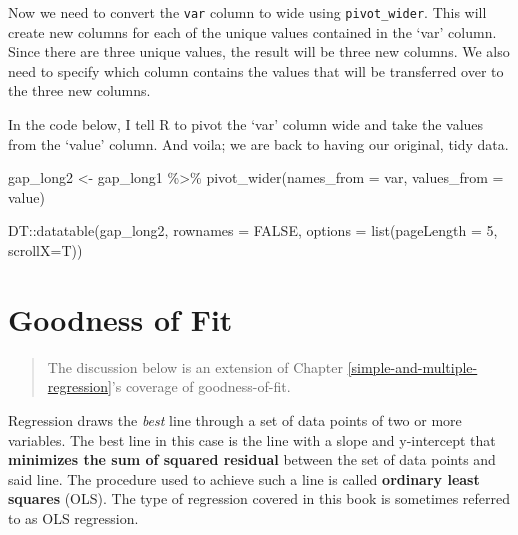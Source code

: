 \documentclass[
]{book}
\makeatletter
\newenvironment{Shaded}{\begin{snugshade}}{\end{snugshade}}
\newcommand{\AttributeTok}[1]{\textcolor[rgb]{0.61,0.61,0.61}{#1}}
\newcommand{\ConstantTok}[1]{\textcolor[rgb]{0,0,0}{#1}}
\newcommand{\DecValTok}[1]{\textcolor[rgb]{0.06,0.06,0.06}{#1}}
\newcommand{\FunctionTok}[1]{\textcolor[rgb]{0,0,0}{#1}}
\newcommand{\NormalTok}[1]{#1}
\newcommand{\OtherTok}[1]{\textcolor[rgb]{0.37,0.37,0.37}{#1}}
\newcommand{\SpecialCharTok}[1]{\textcolor[rgb]{0,0,0}{#1}}
\newenvironment{kframe}{%
\medskip{}
\setlength{\fboxsep}{.8em}
 \def\at@end@of@kframe{}%
 \ifinner\ifhmode%
  \def\at@end@of@kframe{\end{minipage}}%
  \begin{minipage}{\columnwidth}%
 \fi\fi%
 \def\FrameCommand##1{\hskip\@totalleftmargin \hskip-\fboxsep
 \colorbox{shadecolor}{##1}\hskip-\fboxsep
     \hskip-\linewidth \hskip-\@totalleftmargin \hskip\columnwidth}%
 \MakeFramed {\advance\hsize-\width
   \@totalleftmargin\z@ \linewidth\hsize
   \@setminipage}}%
 {\par\unskip\endMakeFramed%
 \at@end@of@kframe}
\renewenvironment{Shaded}{\begin{kframe}}{\end{kframe}}
\makeatother
\begin{document}
\hypertarget{htmlwidget-335f70a3897292f03ade}{}

Now we need to convert the \texttt{var} column to wide using \texttt{pivot\_wider}. This will create new columns for each of the unique values contained in the `var' column. Since there are three unique values, the result will be three new columns. We also need to specify which column contains the values that will be transferred over to the three new columns.

In the code below, I tell R to pivot the `var' column wide and take the values from the `value' column. And voila; we are back to having our original, tidy data.

\begin{Shaded}
\begin{Highlighting}[]
\NormalTok{gap\_long2 }\OtherTok{\textless{}{-}}\NormalTok{ gap\_long1 }\SpecialCharTok{\%\textgreater{}\%} 
  \FunctionTok{pivot\_wider}\NormalTok{(}\AttributeTok{names\_from =}\NormalTok{ var,}
              \AttributeTok{values\_from =}\NormalTok{ value)}

\NormalTok{DT}\SpecialCharTok{::}\FunctionTok{datatable}\NormalTok{(gap\_long2, }\AttributeTok{rownames =} \ConstantTok{FALSE}\NormalTok{, }\AttributeTok{options =} \FunctionTok{list}\NormalTok{(}\AttributeTok{pageLength =} \DecValTok{5}\NormalTok{, }\AttributeTok{scrollX=}\NormalTok{T))}
\end{Highlighting}
\end{Shaded}

\hypertarget{htmlwidget-5af83f668a7410498c9c}{}

\hypertarget{appendixC}{%
\chapter{Goodness of Fit}\label{appendixC}}

\begin{quote}
The discussion below is an extension of Chapter \ref{simple-and-multiple-regression}'s coverage of goodness-of-fit.
\end{quote}

Regression draws the \emph{best} line through a set of data points of two or more variables. The best line in this case is the line with a slope and y-intercept that \textbf{minimizes the sum of squared residual} between the set of data points and said line. The procedure used to achieve such a line is called \textbf{ordinary least squares} (OLS). The type of regression covered in this book is sometimes referred to as OLS regression.
\end{document}

